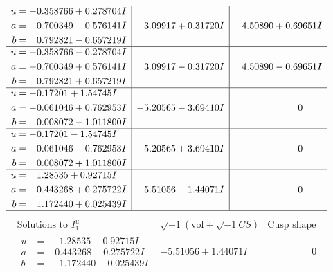 \documentclass[1p]{elsarticle_modified}
\theoremstyle{definition}
\newcommand{\I}{\sqrt{-1}}
\begin{document}
$$\begin{array}{c|c|c}
\begin{aligned}
u &= -0.358766 + 0.278704 I \\
a &= -0.700349 - 0.576141 I \\
b &= \phantom{-}0.792821 - 0.657219 I\end{aligned}
 & \phantom{-}3.09917 + 0.31720 I & \phantom{-}4.50890 + 0.69651 I \\ \hline\begin{aligned}
u &= -0.358766 - 0.278704 I \\
a &= -0.700349 + 0.576141 I \\
b &= \phantom{-}0.792821 + 0.657219 I\end{aligned}
 & \phantom{-}3.09917 - 0.31720 I & \phantom{-}4.50890 - 0.69651 I \\ \hline\begin{aligned}
u &= -0.17201 + 1.54745 I \\
a &= -0.061046 + 0.762953 I \\
b &= \phantom{-}0.008072 - 1.011800 I\end{aligned}
 & -5.20565 - 3.69410 I & \phantom{-0.000000 } 0 \\ \hline\begin{aligned}
u &= -0.17201 - 1.54745 I \\
a &= -0.061046 - 0.762953 I \\
b &= \phantom{-}0.008072 + 1.011800 I\end{aligned}
 & -5.20565 + 3.69410 I & \phantom{-0.000000 } 0 \\ \hline\begin{aligned}
u &= \phantom{-}1.28535 + 0.92715 I \\
a &= -0.443268 + 0.275722 I \\
b &= \phantom{-}1.172440 + 0.025439 I\end{aligned}
 & -5.51056 - 1.44071 I & \phantom{-0.000000 } 0\\
 \hline 
 \end{array}$$\newpage$$\begin{array}{c|c|c}  
\text{Solutions to }I^u_{1}& \I (\text{vol} + \sqrt{-1}CS) & \text{Cusp shape}\\
 \hline 
\begin{aligned}
u &= \phantom{-}1.28535 - 0.92715 I \\
a &= -0.443268 - 0.275722 I \\
b &= \phantom{-}1.172440 - 0.025439 I\end{aligned}
 & -5.51056 + 1.44071 I & \phantom{-0.000000 } 0 \\ \hline\begin{aligned}

\end{aligned}
\end{array}$$
\end{document}
